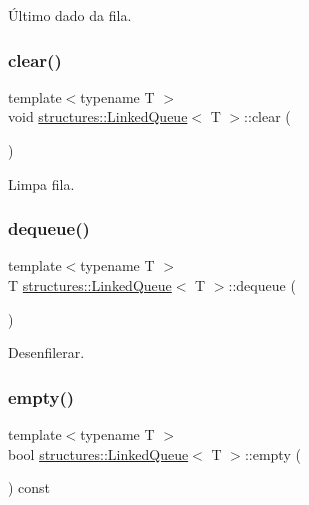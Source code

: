 Último dado da fila. 

\mbox{\label{classstructures_1_1LinkedQueue_a67dfb58a8feb96abccbd20862767e981}} 
\subsubsection{\texorpdfstring{clear()}{clear()}}
{\footnotesize\ttfamily template$<$typename T $>$ \\
void \hyperlink{classstructures_1_1LinkedQueue}{structures\+::\+Linked\+Queue}$<$ T $>$\+::clear (\begin{DoxyParamCaption}{ }\end{DoxyParamCaption})}



Limpa fila. 

\mbox{\label{classstructures_1_1LinkedQueue_af6037408a07637554b8a8be7201a756d}} 
\subsubsection{\texorpdfstring{dequeue()}{dequeue()}}
{\footnotesize\ttfamily template$<$typename T $>$ \\
T \hyperlink{classstructures_1_1LinkedQueue}{structures\+::\+Linked\+Queue}$<$ T $>$\+::dequeue (\begin{DoxyParamCaption}{ }\end{DoxyParamCaption})}



Desenfilerar. 

\mbox{\label{classstructures_1_1LinkedQueue_a24995d6b61ce9e8d05718c966b699c5a}} 
\subsubsection{\texorpdfstring{empty()}{empty()}}
{\footnotesize\ttfamily template$<$typename T $>$ \\
bool \hyperlink{classstructures_1_1LinkedQueue}{structures\+::\+Linked\+Queue}$<$ T $>$\+::empty (\begin{DoxyParamCaption}{ }\end{DoxyParamCaption}) const}



